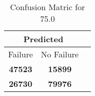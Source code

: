 \begin{table}[] 
\caption{Confusion Matric for 75.0} 
\label{Table: Prediction Accuracy-None75.0DecisionTrees100EKF-ignoresolarPanelDipole-solarPanelDipole} 
\centering 
\begin{tabular} 
 {@{}ccc@{}} 
\toprule 
\multicolumn{2}{c}{\textbf{Predicted}}
 \\ \midrule 
\multicolumn{1}{|c|}{Failure} & 
\multicolumn{1}{c|}{No Failure}
 \\ \midrule 
\multicolumn{1}{|c|}{\color{green}\textbf{47523}} & 
\multicolumn{1}{c|}{\color{red}\textbf{15899}}
 \\ \midrule 
\multicolumn{1}{|c|}{\color{red}\textbf{26730}} & 
\multicolumn{1}{c|}{\color{green}\textbf{79976}}
 \\ \bottomrule 
\end{tabular} 
\end{table} 
